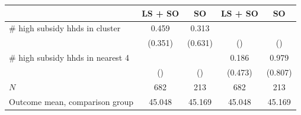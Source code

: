 \begin{tabular}{lcccc}
\hline\hline
 & LS + SO & SO & LS + SO & SO \\
\hline
# high subsidy hhds in cluster & 0.459 & 0.313 &  &  \\
 & (0.351) & (0.631) & () & () \\
# high subsidy hhds in nearest 4 &  &  & 0.186 & 0.979 \\
 & () & () & (0.473) & (0.807) \\
\hline
$N$ & 682 & 213 & 682 & 213 \\
Outcome mean, comparison group & 45.048 & 45.169 & 45.048 & 45.169 \\
\hline\hline
\end{tabular}
